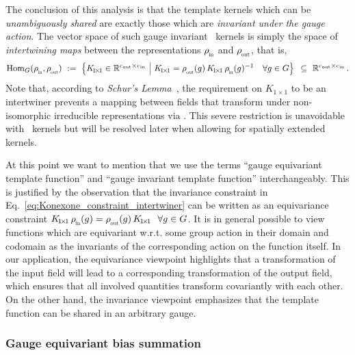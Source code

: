 The conclusion of this analysis is that the template kernels which can be \emph{unambiguously shared} are exactly those which are \emph{invariant under the gauge action}.
The vector space of such gauge invariant \onexone\ kernels is simply the space of \emph{intertwining maps} between the representations $\rhoin$ and $\rhoout$, that is,
\begin{align}\label{eq:gauge_onexone_solution_space}
    \Hom_G(\rhoin,\rhoout)\ :=\ 
    \pig\{ K_{\!1\!\times\!1} \in \R^{\cout\times\cin}\ \pig|\ 
    K_{\!1\!\times\!1} = \rhoout(g)\, K_{\!1\!\times\!1}\, \rhoin(g)^{-1}\ \ \ \forall g\in G \pig\}
    \,\ \subseteq\ \R^{\cout\times\cin} \,.
\end{align}
Note that, according to \emph{Schur's Lemma}~\cite{gallier2019harmonicRepr}, the requirement on $K_{\!1\!\times\!1}$ to be an intertwiner prevents a mapping between fields that transform under non-isomorphic irreducible representations via \onexones.
This severe restriction is unavoidable with \onexone\ kernels but will be resolved later when allowing for spatially extended kernels.

At this point we want to mention that we use the terms ``gauge equivariant template function'' and ``gauge invariant template function'' interchangeably.
This is justified by the observation that the invariance constraint in Eq.~\eqref{eq:Konexone_constraint_intertwiner} can be written as an equivariance constraint
$K_{\!1\!\times\!1}\, \rhoin(g) = \rhoout(g)\, K_{\!1\!\times\!1}\ \ \forall g\in G$.
It is in general possible to view functions which are equivariant w.r.t. some group action in their domain and codomain as the invariants of the corresponding action on the function itself.
In our application, the equivariance viewpoint highlights that a transformation of the input field will lead to a corresponding transformation of the output field, which ensures that all involved quantities transform covariantly with each other.
On the other hand, the invariance viewpoint emphasizes that the template function can be shared in an arbitrary gauge.










\subsubsection{Gauge equivariant bias summation}
\label{sec:gauge_bias_summation}

